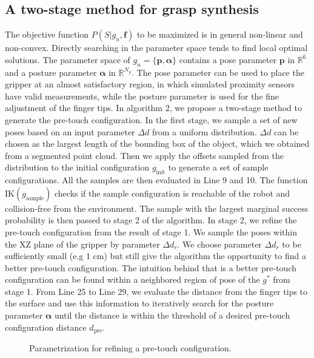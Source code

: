 \subsection{A two-stage method for grasp synthesis}
The objective function $P(S | g_n, \bm{f})$ to be maximized is in general non-linear and non-convex. Directly searching in the parameter space tends to find local optimal solutions. The parameter space of $g_n = \lbrace \bm{p}, \bm{\alpha} \rbrace $ contains a pose parameter $\bm{p}$ in $\mathbb{R}^6$ and a posture parameter $\bm{\alpha}$ in $\mathbb{R}^{N_g}$. The pose parameter can be used to place the gripper at an almost satisfactory region, in which simulated proximity sensors have valid measurements,  while the posture parameter is used for the fine adjustment of the finger tips. In algorithm 2, we propose a two-stage method to generate the pre-touch configuration. In the first stage, we sample a set of new poses based on an input parameter $\Delta d$ from a uniform distribution. $\Delta d$ can be chosen as the largest length of the bounding box of the object, which we obtained from a segmented point cloud. Then we apply the offsets sampled from the distribution to the initial configuration $g_{\text{init}}$ to generate a set of sample configurations. All the samples are then evaluated in Line 9 and 10. The function IK$(g_{\text{sample}})$ checks if the sample configuration is reachable of the robot and collision-free from the environment. The sample with the largest marginal success probability is then passed to stage 2 of the algorithm. In stage 2, we refine the pre-touch configuration from the result of stage 1.  We sample the poses within the XZ plane of the gripper by parameter $\Delta d_r$. We choose parameter $\Delta d_r$ to be sufficiently small (e.g 1 cm) but still give the algorithm the opportunity to find a better pre-touch configuration. The intuition behind that is a better pre-touch configuration can be found within a neighbored region of pose of the $g^*$ from stage 1. From Line 25 to Line 29, we evaluate the distance from the finger tips to the surface and use this information to iteratively search for the posture parameter $\bm{\alpha}$ until the distance is within the threshold of a desired pre-touch configuration distance $d_{\text{pre}}$.

\begin{figure}[!htbp]
\centering
\def\svgwidth{0.4\linewidth}

\caption{Parametrization for refining a pre-touch configuration.}
\label{fig:algorith_help}
\end{figure}	



